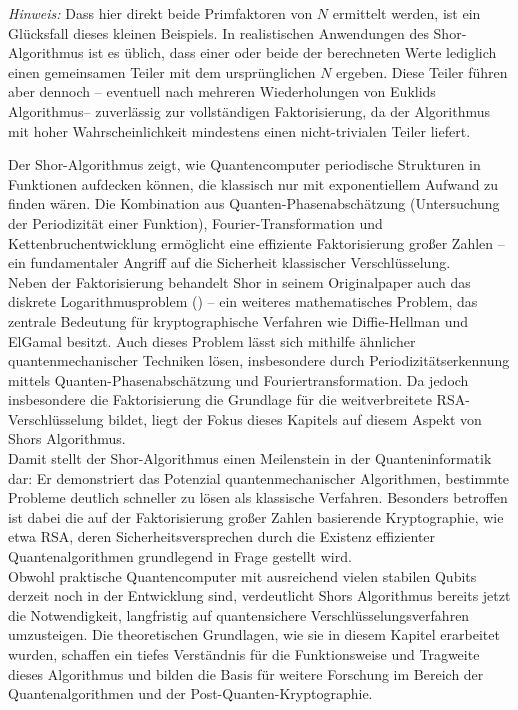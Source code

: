 \begin{enumerate}
\textit{Hinweis:} Dass hier direkt beide Primfaktoren von \( N \) ermittelt werden, ist ein Glücksfall dieses kleinen Beispiels. In realistischen Anwendungen des Shor-Algorithmus ist es üblich, dass einer oder beide der berechneten Werte lediglich einen gemeinsamen Teiler mit dem ursprünglichen \( N \) ergeben. Diese Teiler führen aber dennoch – eventuell nach mehreren Wiederholungen von Euklids Algorithmus– zuverlässig zur vollständigen Faktorisierung, da der Algorithmus mit hoher Wahrscheinlichkeit mindestens einen nicht-trivialen Teiler liefert.\\


\end{enumerate}

Der Shor-Algorithmus zeigt, wie Quantencomputer periodische Strukturen in Funktionen aufdecken können, die klassisch nur mit exponentiellem Aufwand zu finden wären. Die Kombination aus Quanten-Phasenabschätzung (Untersuchung der Periodizität einer Funktion), Fourier-Transformati\-on und Kettenbruchentwicklung ermöglicht eine effiziente Faktorisierung großer Zahlen – ein fundamentaler Angriff auf die Sicherheit klassischer Verschlüsselung.\\

Neben der Faktorisierung behandelt Shor in seinem Originalpaper auch das diskrete Logarithmusproblem (\cite[19-24]{shor_polynomial-time_1994})
 – ein weiteres mathematisches Problem, das zentrale Bedeutung für kryptographische Verfahren wie Diffie-Hellman und ElGamal besitzt. Auch dieses Problem lässt sich mithilfe ähnlicher quantenmechanischer Techniken lösen, insbesondere durch Periodizitätserkennung mittels Quanten-Phasenabschätzung und Fouriertransformation. Da jedoch insbesondere die Faktorisierung die Grundlage für die weitverbreitete RSA-Verschlüsselung bildet, liegt der Fokus dieses Kapitels auf diesem Aspekt von Shors Algorithmus.\\

Damit stellt der Shor-Algorithmus einen Meilenstein in der Quanteninformatik dar: Er demonstriert das Potenzial quantenmechanischer Algorithmen, bestimmte Probleme deutlich schneller zu lösen als klassische Verfahren. Besonders betroffen ist dabei die auf der Faktorisierung großer Zahlen basierende Kryptographie, wie etwa RSA, deren Sicherheitsversprechen durch die Existenz effizienter Quantenalgorithmen grundlegend in Frage gestellt wird.\\

Obwohl praktische Quantencomputer mit ausreichend vielen stabilen Qubits derzeit noch in der Entwicklung sind, verdeutlicht Shors Algorithmus bereits jetzt die Notwendigkeit, langfristig auf quantensichere Verschlüsselungsverfahren umzusteigen. Die theoretischen Grundlagen, wie sie in diesem Kapitel erarbeitet wurden, schaffen ein tiefes Verständnis für die Funktionsweise und Tragweite dieses Algorithmus und bilden die Basis für weitere Forschung im Bereich der Quantenalgorithmen und der Post-Quanten-Kryptographie.

